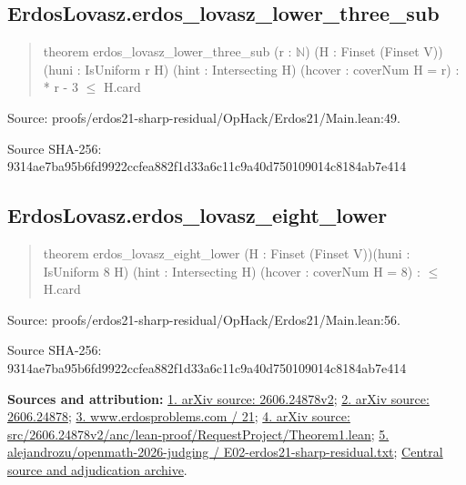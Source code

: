 \documentclass[11pt,a4paper]{article}
\begin{document}
\begin{samepage}
\subsection{ErdosLovasz.erdos\_lovasz\_lower\_three\_sub}
\begin{quote}\small\ttfamily theorem erdos\_lovasz\_lower\_three\_sub (r : \ensuremath{\mathbb{N}}) (H : Finset (Finset V))\newline     (huni : IsUniform r H) (hint : Intersecting H) (hcover : coverNum H = r) : * r - 3 \ensuremath{\leq} H.card\end{quote}
{\small Source: proofs/erdos21-sharp-residual/OpHack/Erdos21/Main.lean:49.\par}

{\small Source SHA-256: 9314ae7ba95b6fd9922ccfea882f1d33a6c11c9a40d750109014c8184ab7e414\par}

\end{samepage}
\begin{samepage}
\subsection{ErdosLovasz.erdos\_lovasz\_eight\_lower}
\begin{quote}\small\ttfamily theorem erdos\_lovasz\_eight\_lower (H : Finset (Finset V))\newline     (huni : IsUniform 8 H) (hint : Intersecting H) (hcover : coverNum H = 8) : \ensuremath{\leq} H.card\end{quote}
{\small Source: proofs/erdos21-sharp-residual/OpHack/Erdos21/Main.lean:56.\par}

{\small Source SHA-256: 9314ae7ba95b6fd9922ccfea882f1d33a6c11c9a40d750109014c8184ab7e414\par}

{\small\textbf{Sources and attribution:} \href{https://arxiv.org/html/2606.24878v2}{1. arXiv source: 2606.24878v2}; \href{https://arxiv.org/abs/2606.24878}{2. arXiv source: 2606.24878}; \href{https://www.erdosproblems.com/21}{3. www.erdosproblems.com / 21}; \href{https://arxiv.org/src/2606.24878v2/anc/lean-proof/RequestProject/Theorem1.lean}{4. arXiv source: src/2606.24878v2/anc/lean-proof/RequestProject/Theorem1.lean}; \href{https://github.com/alejandrozu/openmath-2026-judging/blob/d0ed487f487fa7ec814ff705ab55249983fe8707/OpenMath-Judging/review/entries/E02-erdos21-sharp-residual.txt}{5. alejandrozu/openmath-2026-judging / E02-erdos21-sharp-residual.txt}; \href{https://github.com/alejandrozu/openmath-2026-judging}{Central source and adjudication archive}.\par}

\end{samepage}
\clearpage
\end{document}
